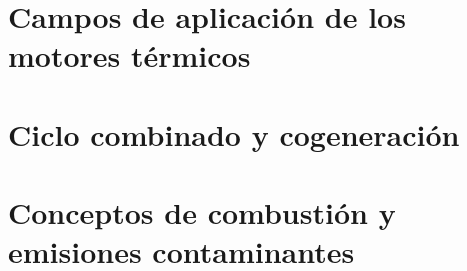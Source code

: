 \section{Campos de aplicación de los motores térmicos}

\section{Ciclo combinado y cogeneración}

\section{Conceptos de combustión y emisiones contaminantes}